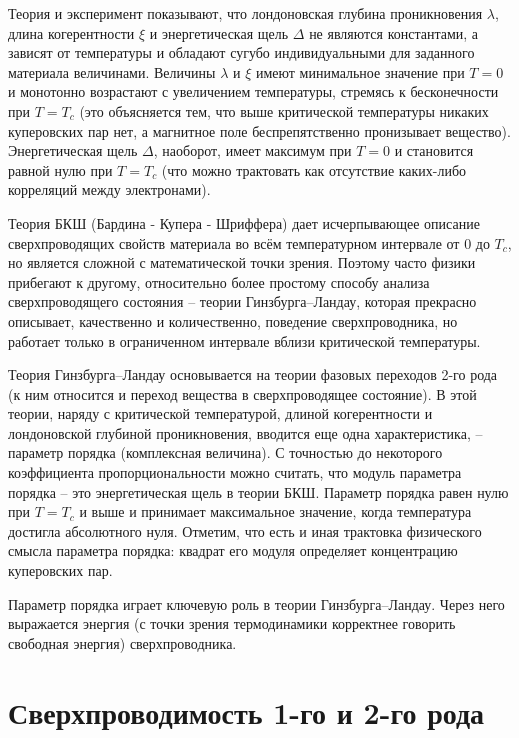 Теория и эксперимент показывают, что лондоновская глубина проникновения 
\( \lambda \), длина когерентности \( \xi \) и энергетическая щель 
\( \Delta \) не являются константами, а зависят от температуры и обладают 
сугубо индивидуальными для заданного материала величинами. Величины 
\( \lambda \) и \( \xi \) имеют минимальное значение при \( T = 0 \) и 
монотонно возрастают с увеличением температуры, стремясь к бесконечности при 
\( T = T_c \) (это объясняется тем, что выше критической температуры никаких 
куперовских пар нет, а магнитное поле беспрепятственно пронизывает вещество). 
Энергетическая щель \( \Delta \), наоборот, имеет максимум при \( T = 0 \) и 
становится равной нулю при \( T = T_c \) (что можно трактовать как отсутствие 
каких-либо корреляций между электронами).

Теория БКШ (Бардина - Купера - Шриффера) дает исчерпывающее описание 
сверхпроводящих свойств материала во всём температурном интервале от \( 0 \) 
до \( T_c \), но является сложной с математической точки зрения. Поэтому часто 
физики прибегают к другому, относительно более простому способу анализа 
сверхпроводящего состояния -- теории Гинзбурга–Ландау, которая прекрасно 
описывает, качественно и количественно, поведение сверхпроводника, но работает 
только в ограниченном интервале вблизи критической температуры.

Теория Гинзбурга–Ландау основывается на теории фазовых переходов 2-го рода 
(к ним относится и переход вещества в сверхпроводящее состояние). В этой 
теории, наряду с критической температурой, длиной когерентности и 
лондоновской глубиной проникновения, вводится еще одна характеристика, -- 
параметр порядка (комплексная величина). С точностью до некоторого 
коэффициента пропорциональности можно считать, что модуль параметра порядка -- 
это энергетическая щель в теории БКШ. Параметр порядка равен нулю при 
\( T = T_c \) и выше и принимает максимальное значение, когда температура 
достигла абсолютного нуля. Отметим, что есть и иная трактовка физического 
смысла параметра порядка: квадрат его модуля определяет концентрацию 
куперовских пар.

Параметр порядка играет ключевую роль в теории Гинзбурга–Ландау. Через него 
выражается энергия (с точки зрения термодинамики корректнее говорить 
свободная энергия) сверхпроводника. 

\section{Сверхпроводимость 1-го и 2-го рода}

